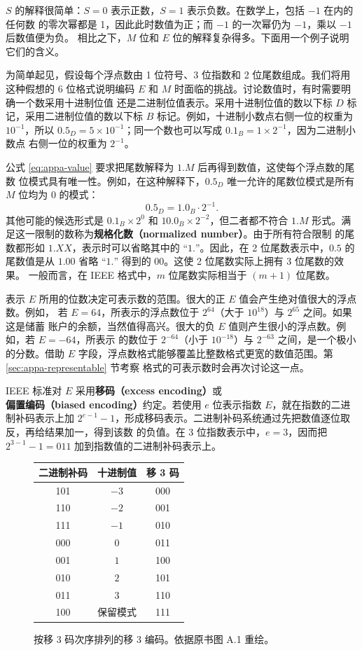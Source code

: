 $S$ 的解释很简单：$S=0$ 表示正数，$S=1$ 表示负数。在数学上，包括 $-1$ 在内的任何数
的零次幂都是 1，因此此时数值为正；而 $-1$ 的一次幂仍为 $-1$，乘以 $-1$ 后数值便为负。
相比之下，$M$ 位和 $E$ 位的解释复杂得多。下面用一个例子说明它们的含义。

为简单起见，假设每个浮点数由 1 位符号、3 位指数和 2 位尾数组成。我们将用这种假想的
6 位格式说明编码 $E$ 和 $M$ 时面临的挑战。讨论数值时，有时需要明确一个数采用十进制位值
还是二进制位值表示。采用十进制位值的数以下标 $D$ 标记，采用二进制位值的数以下标 $B$
标记。例如，十进制小数点右侧一位的权重为 $10^{-1}$，所以
$0.5_D=5\times10^{-1}$；同一个数也可以写成 $0.1_B=1\times2^{-1}$，因为二进制小数点
右侧一位的权重为 $2^{-1}$。

公式 \eqref{eq:appa-value} 要求把尾数解释为 $1.M$ 后再得到数值，这使每个浮点数的尾数
位模式具有唯一性。例如，在这种解释下，$0.5_D$ 唯一允许的尾数位模式是所有 $M$ 位均为
0 的模式：
\[
  0.5_D=1.0_B\cdot2^{-1}.
\]
其他可能的候选形式是 $0.1_B\times2^0$ 和 $10.0_B\times2^{-2}$，但二者都不符合 $1.M$
形式。满足这一限制的数称为\textbf{规格化数（normalized number）}。由于所有符合限制
的尾数都形如 $1.XX$，表示时可以省略其中的 ``$1.$''。因此，在 2 位尾数表示中，$0.5$ 的
尾数值是从 $1.00$ 省略 ``$1.$'' 得到的 $00$。这使 2 位尾数实际上拥有 3 位尾数的效果。
一般而言，在 IEEE 格式中，$m$ 位尾数实际相当于 $(m+1)$ 位尾数。

表示 $E$ 所用的位数决定可表示数的范围。很大的正 $E$ 值会产生绝对值很大的浮点数。例如，
若 $E=64$，所表示的浮点数位于 $2^{64}$（大于 $10^{18}$）与 $2^{65}$ 之间。如果这是储蓄
账户的余额，当然值得高兴。很大的负 $E$ 值则产生很小的浮点数。例如，若 $E=-64$，所表示
的数位于 $2^{-64}$（小于 $10^{-18}$）与 $2^{-63}$ 之间，是一个极小的分数。借助 $E$
字段，浮点数格式能够覆盖比整数格式更宽的数值范围。第 \ref{sec:appa-representable} 节考察
格式的可表示数时会再次讨论这一点。

IEEE 标准对 $E$ 采用\textbf{移码（excess encoding）}或\textbf{偏置编码（biased
encoding）}约定。若使用 $e$ 位表示指数 $E$，就在指数的二进制补码表示上加
$2^{e-1}-1$，形成移码表示。二进制补码系统通过先把数值逐位取反，再给结果加一，得到该数
的负值。在 3 位指数表示中，$e=3$，因而把 $2^{3-1}-1=011$ 加到指数值的二进制补码表示上。

\begin{figure}[htbp]
  \centering
  \small
  \begin{tabular}{ccc}
    \hline
    \textbf{二进制补码} & \textbf{十进制值} & \textbf{移 3 码} \\
    \hline
    101 & $-3$ & 000 \\
    110 & $-2$ & 001 \\
    111 & $-1$ & 010 \\
    000 & $0$  & 011 \\
    001 & $1$  & 100 \\
    010 & $2$  & 101 \\
    011 & $3$  & 110 \\
    100 & 保留模式 & 111 \\
    \hline
  \end{tabular}
  \caption{按移 3 码次序排列的移 3 编码。依据原书图 A.1 重绘。}
  \label{fig:a-1}
\end{figure}


